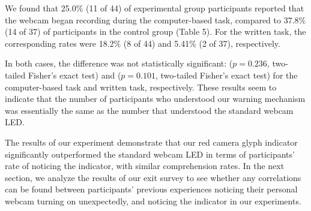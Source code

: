 \documentclass{sigchi}
\begin{document}
We found that 25.0\% (11 of 44) of experimental group participants reported that the webcam began recording during the computer-based task, compared to 37.8\% (14 of 37) of participants in the control group (Table 5). For the written task, the corresponding rates were 18.2\% (8 of 44) and 5.41\% (2 of 37), respectively.




In both cases, the difference was not statistically significant: ($p=0.236$, two-tailed Fisher's exact test) and ($p=0.101$, two-tailed Fisher's exact test) for the computer-based task and written task, respectively. These results seem to indicate that the number of participants who understood our warning mechanism was essentially the same as the number that understood the standard webcam LED.

The results of our experiment demonstrate that our red camera glyph indicator significantly outperformed the standard webcam LED in terms of participants' rate of noticing the indicator, with similar comprehension rates. In the next section, we analyze the results of our exit survey to see whether any correlations can be found between participants' previous experiences noticing their personal webcam turning on unexpectedly, and noticing the indicator in our experiments. 
\end{document}

